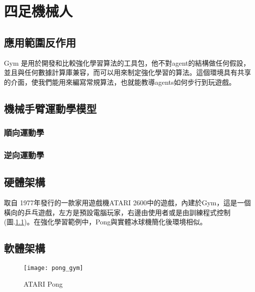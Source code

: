 \chapter{四足機械人}
\section{應用範圍反作用}
 Gym 是用於開發和比較強化學習算法的工具包，他不對agent的結構做任何假設，並且與任何數據計算庫兼容，而可以用來制定強化學習的算法。這個環境具有共享的介面，使我們能用來編寫常規算法，也就能教導agents如何步行到玩遊戲。\\[6pt]

\section{機械手臂運動學模型}
\subsection{順向運動學}
\subsection{逆向運動學}

\section{硬體架構}
 取自 1977年發行的一款家用遊戲機ATARI 2600中的遊戲，內建於Gym，這是一個橫向的乒乓遊戲，左方是預設電腦玩家，右邊由使用者或是由訓練程式控制(圖.\ref{fig.pong})。在強化學習範例中，Pong與實體冰球機簡化後環境相似。\\
 
 \section{軟體架構}
\begin{figure}[hbt!]
\begin{center}
\texttt{[image: pong\_gym]}
\caption{\Large ATARI Pong}\label{fig.pong}
\end{center}
\end{figure} 

\newpage
